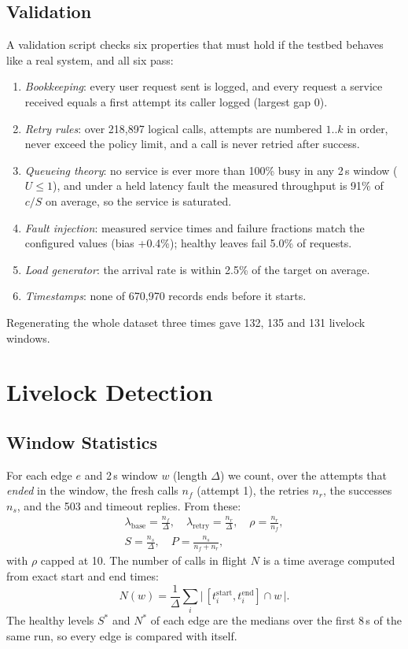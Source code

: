 \documentclass[conference,a4paper]{IEEEtran}
\begin{document}
\subsection{Validation}
A validation script checks six properties that must hold if the testbed behaves like a real system, and all six pass:
\begin{enumerate}
\item \emph{Bookkeeping}: every user request sent is logged, and every request a service received equals a first attempt its caller logged (largest gap 0).
\item \emph{Retry rules}: over 218,897 logical calls, attempts are numbered $1..k$ in order, never exceed the policy limit, and a call is never retried after success.
\item \emph{Queueing theory}: no service is ever more than 100\% busy in any 2\,s window ($U \le 1$), and under a held latency fault the measured throughput is 91\% of $c/S$ on average, so the service is saturated.
\item \emph{Fault injection}: measured service times and failure fractions match the configured values (bias +0.4\%); healthy leaves fail 5.0\% of requests.
\item \emph{Load generator}: the arrival rate is within 2.5\% of the target on average.
\item \emph{Timestamps}: none of 670,970 records ends before it starts.
\end{enumerate}
Regenerating the whole dataset three times gave 132, 135 and 131 livelock windows.

\section{Livelock Detection}
\label{sec:detect}

\subsection{Window Statistics}
For each edge $e$ and 2\,s window $w$ (length $\Delta$) we count, over the attempts that \emph{ended} in the window, the fresh calls $n_f$ (attempt 1), the retries $n_r$, the successes $n_s$, and the 503 and timeout replies. From these:
\begin{gather}
\lambda_{\text{base}} = \frac{n_f}{\Delta}, \quad \lambda_{\text{retry}} = \frac{n_r}{\Delta}, \quad \rho = \frac{n_r}{n_f}, \\
S = \frac{n_s}{\Delta}, \quad P = \frac{n_s}{n_f+n_r},
\end{gather}
with $\rho$ capped at 10. The number of calls in flight $N$ is a time average computed from exact start and end times:
\begin{equation}
N(w) = \frac{1}{\Delta} \sum_i \bigl|\,[t^{\text{start}}_i, t^{\text{end}}_i] \cap w\,\bigr| .
\end{equation}
The healthy levels $S^\ast$ and $N^\ast$ of each edge are the medians over the first 8\,s of the same run, so every edge is compared with itself.
\end{document}

